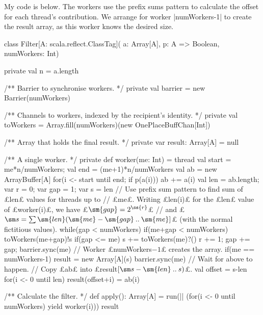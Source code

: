 \begin{answerS}
My code is below.  The workers use the prefix sums pattern to calculate the
offset for each thread's contribution.  We arrange for worker |numWorkers-1| to
create the result array, as this worker knows the desired size. 
%
\begin{scala}
class Filter[A: scala.reflect.ClassTag](
    a: Array[A], p: A => Boolean, numWorkers: Int){
  private val n = a.length

  /** Barrier to synchronise workers. */
  private val barrier = new Barrier(numWorkers)

  /** Channels to workers, indexed by the recipient's identity. */
  private val toWorkers = Array.fill(numWorkers)(new OnePlaceBuffChan[Int])

  /** Array that holds the final result. */
  private var result: Array[A] = null

  /** A single worker. */
  private def worker(me: Int) = thread{
    val start = me*n/numWorkers; val end = (me+1)*n/numWorkers
    val ab = new ArrayBuffer[A]
    for(i <- start until end; if p(a(i))) ab += a(i)
    val len = ab.length; var r = 0; var gap = 1; var s = len
    // Use prefix sum pattern to find sum of £len£ values for threads up to
    // £me£.  Writing £len(i)£ for the £len£ value of £worker(i)£, we have £$\sm{gap} = 2^{\ss{r}}$£
    // and £$\sm s = \sum \sm{len}(\sm{me}-\sm{gap}\upto\sm{me}]$£ (with the normal fictitious values).
    while(gap < numWorkers){
      if(me+gap < numWorkers) toWorkers(me+gap)!s
      if(gap <= me) s += toWorkers(me)?()
      r += 1; gap += gap; barrier.sync(me)
    }
    // Worker £numWorkers$-1$£ creates the array.
    if(me == numWorkers-1) result = new Array[A](s)
    barrier.sync(me) // Wait for above to happen.
    // Copy £ab£ into £result$\interval{\sm s - \sm{len}}{s}$£.
    val offset = s-len  
    for(i <- 0 until len) result(offset+i) = ab(i)
  }

  /** Calculate the filter. */
  def apply(): Array[A] = {
    run(|| (for(i <- 0 until numWorkers) yield worker(i)))
    result
  }
}
\end{scala}
\end{answerS}
